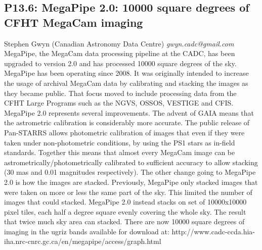 \documentclass{report}
\begin{document}
\subsection*{P13.6: MegaPipe 2.0: 10000 square degrees of CFHT MegaCam imaging}
\bigskip
Stephen Gwyn (Canadian Astronomy Data Centre) \newline   \newline   \newline   \newline  \newline  \newline\newline
{\it gwyn.cadc@gmail.com}\newline
\newline\newline
MegaPipe, the MegaCam data processing pipeline at the CADC, has been
upgraded to version 2.0 and has processed 10000 square degrees of
the sky.  MegaPipe has been operating since 2008. It was originally
intended to increase the usage of archival MegaCam data by calibrating
and stacking the images as they became public. That focus moved to
include processing data from the CFHT Large Programs such as the NGVS,
OSSOS, VESTIGE and CFIS.  MegaPipe 2.0 represents several
improvements. The advent of GAIA means that the astrometric
calibration is considerably more accurate. The public release of
Pan-STARRS allows photometric calibration of images that even if they
were taken under non-photometric conditions, by using the PS1 stars as
in-field standards. Together this means that almost every MegaCam
image can be astrometrically/photometrically calibrated to sufficient
accuracy to allow stacking (30 mas and 0.01 magnitudes
respectively). The other change going to MegaPipe 2.0 is how the
images are stacked. Previously, MegaPipe only stacked images that were
taken on more or less the same part of the sky. This limited the
number of images that could stacked.  MegaPipe 2.0 instead stacks on
set of 10000x10000 pixel tiles, each half a degree square evenly
covering the whole sky. The result that twice much sky area can
stacked.  There are now 10000 square
degrees of imaging in the ugriz bands available for download at:
http://www.cadc-ccda.hia-iha.nrc-cnrc.gc.ca/en/megapipe/access/graph.html\newline
\newpage
\end{document}
